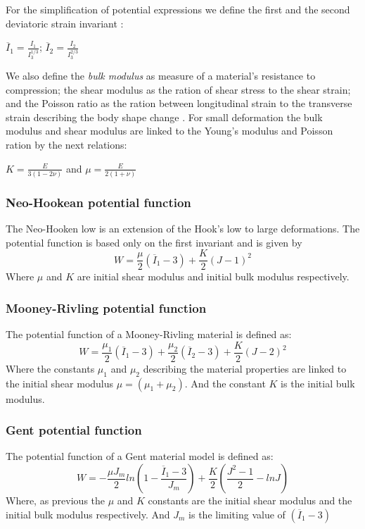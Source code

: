 For the simplification of potential expressions we define the first and the second deviatoric strain invariant :
\begin{center}
$\overline{I}_1=\frac{I_1}{I_3^{1/3}} $;  $\overline{I}_2=\frac{I_2}{I_3^{2/3}}$
\end{center}

We also define the \textit{ bulk modulus} as measure of a material's resistance to compression; the shear modulus as the ration of shear stress to the shear strain; and the Poisson ratio as the ration between longitudinal strain to the transverse strain describing the body shape change . For small deformation the bulk modulus and shear modulus are linked to the Young's modulus and Poisson ration by the next relations:
 \begin{center}
  $K = \frac{E}{3(1-2\nu)}$ and $\mu = \frac{E}{2(1+\nu)}$
 \end{center}
  
\subsubsection*{Neo-Hookean potential function}
The Neo-Hooken low is an extension of the Hook's low to large deformations. The potential function is based only on the first invariant and is given by 
\begin{equation}
\label{Neo-Hook}
W =\frac{\mu}{2} (\overline{I}_1-3) + \frac{K}{2}(J-1)^2
\end{equation}
Where $\mu$ and $K$ are initial shear modulus and initial bulk modulus respectively. 
\subsubsection*{Mooney-Rivling potential function}
The potential function of a Mooney-Rivling material is defined as:
\begin{equation}
W=\frac{\mu_1}{2}(\overline{I}_1-3)+\frac{\mu_2}{2}(\overline{I}_2-3)+\frac{K}{2}(J-2)^2
\end{equation}
Where the constants $\mu_1$ and $\mu_2$ describing the material properties are linked to the initial shear modulus $\mu = (\mu_1+\mu_2)$. And the constant $K$ is the initial bulk modulus. 
\subsubsection*{Gent potential function}
The potential function of a Gent material model is defined as:
\begin{equation}
W=-\frac{\mu J_m}{2}ln\left(1-\frac{\overline{I}_1-3}{J_m}\right)+\frac{K}{2}\left(\frac{J^2-1}{2}-lnJ\right)
\end{equation}
 Where, as previous the $\mu$ and $K$ constants are the initial shear modulus and the initial bulk modulus respectively. And $J_m$ is the limiting value of $(\overline{I}_1-3)$

